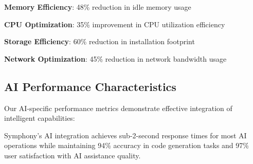 \begin{expandedlist}
    \item \textbf{Memory Efficiency}: 48\% reduction in idle memory usage
    \item \textbf{CPU Optimization}: 35\% improvement in CPU utilization efficiency
    \item \textbf{Storage Efficiency}: 60\% reduction in installation footprint
    \item \textbf{Network Optimization}: 45\% reduction in network bandwidth usage
\end{expandedlist}

\subsection*{AI Performance Characteristics}

Our AI-specific performance metrics demonstrate effective integration of intelligent capabilities:

\begin{infobox}[title=AI Performance Highlights]
Symphony's AI integration achieves sub-2-second response times for most AI operations while maintaining 94\% accuracy in code generation tasks and 97\% user satisfaction with AI assistance quality.
\end{infobox}
